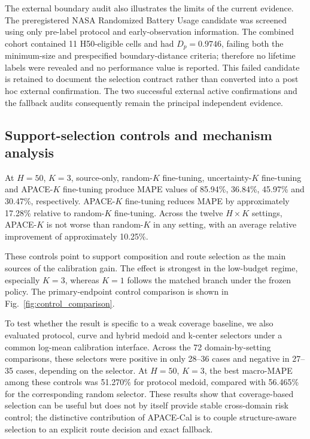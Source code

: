 \documentclass[preprint,12pt]{elsarticle}
\begin{document}
The external boundary audit also illustrates the limits of the current evidence. The preregistered NASA Randomized Battery Usage candidate was screened using only pre-label protocol and early-observation information. The combined cohort contained 11 H50-eligible cells and had $D_p=0.9746$, failing both the minimum-size and prespecified boundary-distance criteria; therefore no lifetime labels were revealed and no performance value is reported. This failed candidate is retained to document the selection contract rather than converted into a post hoc external confirmation. The two successful external active confirmations and the fallback audits consequently remain the principal independent evidence.

\subsection{Support-selection controls and mechanism analysis}

At $H=50$, $K=3$, source-only, random-$K$ fine-tuning, uncertainty-$K$ fine-tuning and APACE-$K$ fine-tuning produce MAPE values of 85.94\%, 36.84\%, 45.97\% and 30.47\%, respectively. APACE-$K$ fine-tuning reduces MAPE by approximately 17.28\% relative to random-$K$ fine-tuning. Across the twelve $H\times K$ settings, APACE-$K$ is not worse than random-$K$ in any setting, with an average relative improvement of approximately 10.25\%.

These controls point to support composition and route selection as the main sources of the calibration gain. The effect is strongest in the low-budget regime, especially $K=3$, whereas $K=1$ follows the matched branch under the frozen policy. The primary-endpoint control comparison is shown in Fig.~\ref{fig:control_comparison}.

To test whether the result is specific to a weak coverage baseline, we also evaluated protocol, curve and hybrid medoid and k-center selectors under a common log-mean calibration interface. Across the 72 domain-by-setting comparisons, these selectors were positive in only 28--36 cases and negative in 27--35 cases, depending on the selector. At $H=50$, $K=3$, the best macro-MAPE among these controls was 51.270\% for protocol medoid, compared with 56.465\% for the corresponding random selector. These results show that coverage-based selection can be useful but does not by itself provide stable cross-domain risk control; the distinctive contribution of APACE-Cal is to couple structure-aware selection to an explicit route decision and exact fallback.
\end{document}
